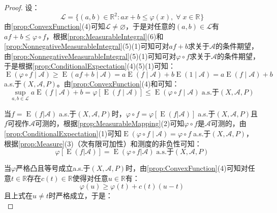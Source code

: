 \begin{proof}
	设：
	\begin{equation*}
		\mathcal{L}=\{(a,b)\in\mathbb{R}^{2}:ax+b\leqslant\varphi(x),\;\forall\;x\in\mathbb{R}^{}\}
	\end{equation*}
	由\cref{prop:ConvexFunction}(4)可知$\mathcal{L}\ne\varnothing$，于是对任意的$(a,b)\in\mathcal{L}$有$af+b\leqslant\varphi\circ f$，根据\cref{prop:MeasurableIntegral}(6)和\cref{prop:NonnegativeMeasurableIntegral}(5)(1)可知可对$af+b$求关于$\mathscr{A}$的条件期望，由\cref{prop:NonnegativeMeasurableIntegral}(5)(1)可知可对$\varphi\circ f$求关于$\mathscr{A}$的条件期望，于是根据\cref{prop:ConditionalExpectation}(4)(5)(1)可知：
	\begin{equation*}
		\operatorname{E}(\varphi\circ f\mid\mathscr{A})\geqslant\operatorname{E}(af+b\mid\mathscr{A})=a\operatorname{E}(f\mid\mathscr{A})+b\operatorname{E}(1\mid\mathscr{A})=a\operatorname{E}(f\mid\mathscr{A})+b
	\end{equation*}
	a.s.于$(X,\mathscr{A},P)$。由\cref{prop:ConvexFunction}(4)和可知：
	\begin{equation*}
		\sup_{a,b\in\mathcal{L}}a\operatorname{E}(f\mid\mathscr{A})+b=\varphi[\operatorname{E}(f\mid\mathscr{A})]\leqslant\operatorname{E}(\varphi\circ f\mid\mathscr{A})\;\text{a.s.于}(X,\mathscr{A},P)
	\end{equation*}\par
	当$f=\operatorname{E}(f|\mathscr{A})\;$a.s.于$(X,\mathscr{A},P)$时，$\varphi\circ f=\varphi[\operatorname{E}(f|\mathscr{A})]\;$a.s.于$(X,\mathscr{A},P)$且$f$可视作$\mathscr{A}$可测的，根据\cref{prop:MeasurableMapping}(2)可知$\varphi\circ f$是$\mathscr{A}$可测的，由\cref{prop:ConditionalExpectation}(1)可知$\operatorname{E}(\varphi\circ f\mid\mathscr{A})=\varphi\circ f\;$a.s.于$(X,\mathscr{A},P)$，根据\cref{prop:Measure}(3)（次有限可加性）和测度的非负性可知：
	\begin{equation*}
		\varphi[\operatorname{E}(f|\mathscr{A})]=\operatorname{E}(\varphi\circ f|\mathscr{A})\;\text{a.s.于}(X,\mathscr{A},P)
	\end{equation*}\par
	当$\varphi$严格凸且等号成立a.s.于$(X,\mathscr{A},P)$时，由\cref{prop:ConvexFunction}(4)可知对任意$t\in\mathbb{R}$存在$c(t)\in\mathbb{R}$使得对任意$u\in\mathbb{R}$有：
	\begin{equation*}
		\varphi(u)\geqslant\varphi(t)+c(t)(u-t)
	\end{equation*}
	且上式在$u\neq t$时严格成立，于是：
	\begin{equation*}

\end{equation*}
\end{proof}
